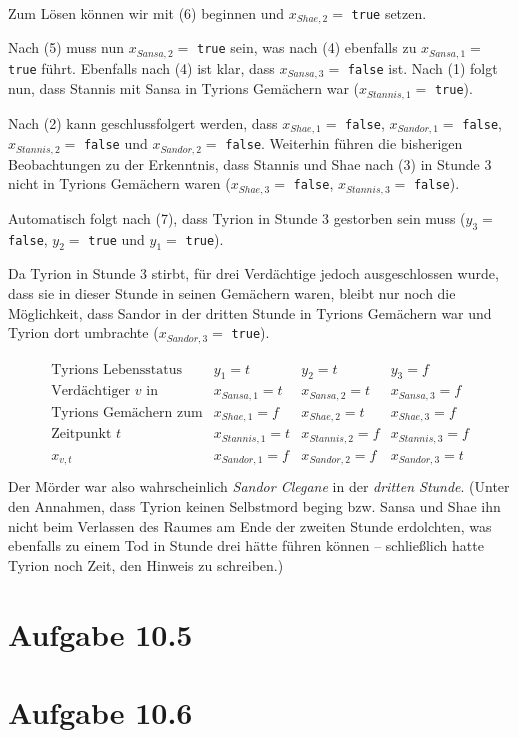 \documentclass{article}
\begin{document}
Zum Lösen können wir mit (6) beginnen und $x_{Shae,2} = $ \texttt{true} setzen.

Nach (5) muss nun $x_{Sansa,2} = $ \texttt{true} sein, was nach (4) ebenfalls zu $x_{Sansa,1} = $ \texttt{true} führt. Ebenfalls nach (4) ist klar, dass $x_{Sansa,3} = $ \texttt{false} ist. Nach (1) folgt nun, dass Stannis mit Sansa in Tyrions Gemächern war ($x_{Stannis,1} = $ \texttt{true}). 

Nach (2) kann geschlussfolgert werden, dass $x_{Shae,1} = $ \texttt{false}, $x_{Sandor,1} = $ \texttt{false},  $x_{Stannis,2} = $ \texttt{false} und $x_{Sandor,2} = $ \texttt{false}. Weiterhin führen die bisherigen Beobachtungen zu der Erkenntnis, dass Stannis und Shae nach (3) in Stunde 3 nicht in Tyrions Gemächern waren ($x_{Shae,3} = $ \texttt{false}, $x_{Stannis,3} = $ \texttt{false}).

Automatisch folgt nach (7), dass Tyrion in Stunde 3 gestorben sein muss ($y_3= $\\\texttt{false}, $y_2= $ \texttt{true} und $y_1= $ \texttt{true}).

Da Tyrion in Stunde 3 stirbt, für drei Verdächtige jedoch ausgeschlossen wurde, dass sie in dieser Stunde in seinen Gemächern waren, bleibt nur noch die Möglichkeit, dass Sandor in der dritten Stunde in Tyrions Gemächern war und Tyrion dort umbrachte ($x_{Sandor,3} = $ \texttt{true}).

\begin{align*}
\begin{array}{l|lll}
\text{Tyrions Lebensstatus}        & y_1 = t & y_2 = t & y_3 = f \\
\hline
\text{Verdächtiger $v$ in}   & x_{Sansa,1}   = t & x_{Sansa,2}   = t & x_{Sansa,3}   = f \\ 
\text{Tyrions Gemächern zum} & x_{Shae,1}    = f & x_{Shae,2}    = t & x_{Shae,3}    = f \\
\text{Zeitpunkt $t$}         & x_{Stannis,1} = t & x_{Stannis,2} = f & x_{Stannis,3} = f \\
x_{v,t}                      & x_{Sandor,1}  = f & x_{Sandor,2}  = f & x_{Sandor,3}  = t \\
\end{array}
\end{align*}
Der Mörder war also wahrscheinlich \emph{Sandor Clegane} in der \emph{dritten Stunde}. (Unter den Annahmen, dass Tyrion keinen Selbstmord beging bzw. Sansa und Shae ihn nicht beim Verlassen des Raumes am Ende der zweiten Stunde erdolchten, was ebenfalls zu einem Tod in Stunde drei hätte führen können -- schließlich hatte Tyrion noch Zeit, den Hinweis zu schreiben.)



\section*{Aufgabe 10.5}



\section*{Aufgabe 10.6}
\end{document}
